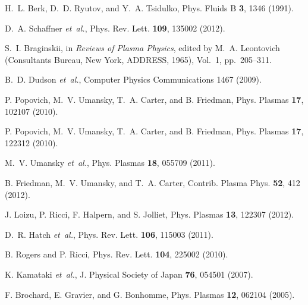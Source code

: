 \documentclass[showpacs,preprintnumbers,amsmath,amssymb,superscriptaddress,aip]{revtex4-1}
\begin{document}
\begin{thebibliography}{10}
H.~L. Berk, D.~D. Ryutov, and Y.~A. Tsidulko, Phys. Fluids B {\bf 3},  1346
  (1991).

D.~A. Schaffner {\it et~al.}, Phys. Rev. Lett. {\bf 109},  135002  (2012).

S.~I. Braginskii,  in {\em Reviews of Plasma Physics}, edited by M.~A.
  Leontovich (Consultants Bureau, New York, ADDRESS, 1965), Vol.~1, pp.\
  205--311.

B.~D. Dudson {\it et~al.}, Computer Physics Communications  1467  (2009).

P. Popovich, M.~V. Umansky, T.~A. Carter, and B. Friedman, Phys. Plasmas {\bf
  17},  102107  (2010).

P. Popovich, M.~V. Umansky, T.~A. Carter, and B. Friedman, Phys. Plasmas {\bf
  17},  122312  (2010).

M.~V. Umansky {\it et~al.}, Phys. Plasmas {\bf 18},  055709  (2011).

B. Friedman, M.~V. Umansky, and T.~A. Carter, Contrib. Plasma Phys. {\bf 52},
  412  (2012).

J. Loizu, P. Ricci, F. Halpern, and S. Jolliet, Phys. Plasmas {\bf 13},  122307
   (2012).

D.~R. Hatch {\it et~al.}, Phys. Rev. Lett. {\bf 106},  115003  (2011).

B. Rogers and P. Ricci, Phys. Rev. Lett. {\bf 104},  225002  (2010).

K. Kamataki {\it et~al.}, J. Physical Society of Japan {\bf 76},  054501
  (2007).

F. Brochard, E. Gravier, and G. Bonhomme, Phys. Plasmas {\bf 12},  062104
  (2005).

\end{thebibliography}
\end{document}

